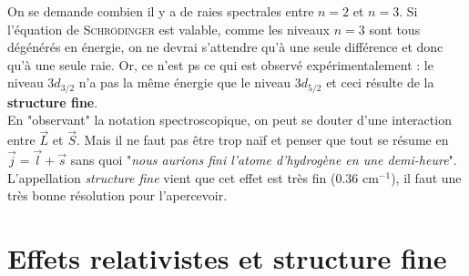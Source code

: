 On se demande combien il y a de raies spectrales entre $n=2$ et $n=3$. Si l'équation de \textsc{Schrödinger} 
est valable, comme les niveaux $n=3$ sont tous dégénérés en énergie, on ne devrai s'attendre qu'à une seule
différence et donc qu'à une seule raie. Or, ce n'est ps ce qui est observé expérimentalement : le niveau
$3d_{3/2}$ n'a pas la même énergie que le niveau $3d_{5/2}$ et ceci résulte de la \textbf{structure fine}. \\

En "observant" la notation spectroscopique, on peut se douter d'une interaction entre $\vec{L}$ et $\vec S$. 
Mais il ne faut pas être trop naïf et penser que tout se résume en $\vec{j}=\vec l +\vec s$ sans quoi 
"\textit{nous aurions fini l'atome d'hydrogène en une demi-heure}". L'appellation \textit{structure fine} 
vient que cet effet est très fin (0.36 cm$^{-1}$), il faut une très bonne résolution pour l’apercevoir.

\section{Effets relativistes et structure fine}
